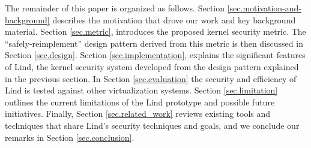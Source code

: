 The remainder of this paper is organized as follows.
Section \ref{sec.motivation-and-background} describes the motivation that drove our work and key background material.
Section \ref{sec.metric}, introduces the proposed kernel security metric. The
``safely-reimplement'' design pattern derived from this metric is then discussed in Section \ref{sec.design}. Section \ref{sec.implementation},
explains the significant features of Lind, the kernel security system developed
from the design pattern explained in the previous section. In Section \ref{sec.evaluation} the security and efficiency of Lind is tested against other virtualization systems. Section \ref{sec.limitation} outlines the current
limitations of the Lind prototype and possible future initiatives.
Finally, Section \ref{sec.related_work} reviews existing tools and techniques that share
Lind's security techniques and goals, and we conclude our remarks in
Section \ref{sec.conclusion}.
